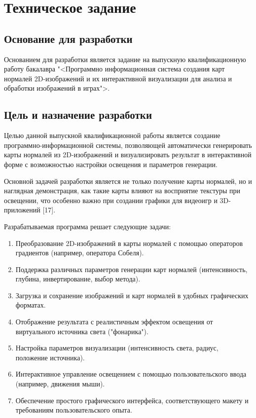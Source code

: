 \section{Техническое задание}
\subsection{Основание для разработки}

Основанием для разработки является задание на выпускную квалификационную работу бакалавра "<Программно информационная система создания карт нормалей 2D-изображений и их интерактивной визуализации для анализа и обработки изображений в играх">.

\subsection{Цель и назначение разработки}

Целью данной выпускной квалификационной работы является создание программно-информационной системы, позволяющей автоматически генерировать карты нормалей из 2D-изображений и визуализировать результат в интерактивной форме с возможностью настройки освещения и параметров генерации.

Основной задачей разработки является не только получение карты нормалей, но и наглядная демонстрация, как такие карты влияют на восприятие текстуры при освещении, что особенно важно при создании графики для видеоигр и 3D-приложений [17].

Разрабатываемая программа решает следующие задачи:
\begin{enumerate}
	\item Преобразование 2D-изображений в карты нормалей с помощью операторов градиентов (например, оператора Собеля).
	\item Поддержка различных параметров генерации карт нормалей (интенсивность, глубина, инвертирование, выбор метода).
	\item Загрузка и сохранение изображений и карт нормалей в удобных графических форматах.
	\item Отображение результата с реалистичным эффектом освещения от виртуального источника света ("фонарика").
	\item Настройка параметров визуализации (интенсивность света, радиус, положение источника).
	\item Интерактивное управление освещением с помощью пользовательского ввода (например, движения мыши).
	\item Обеспечение простого графического интерфейса, соответствующего макету и требованиям пользовательского опыта.
\end{enumerate}
